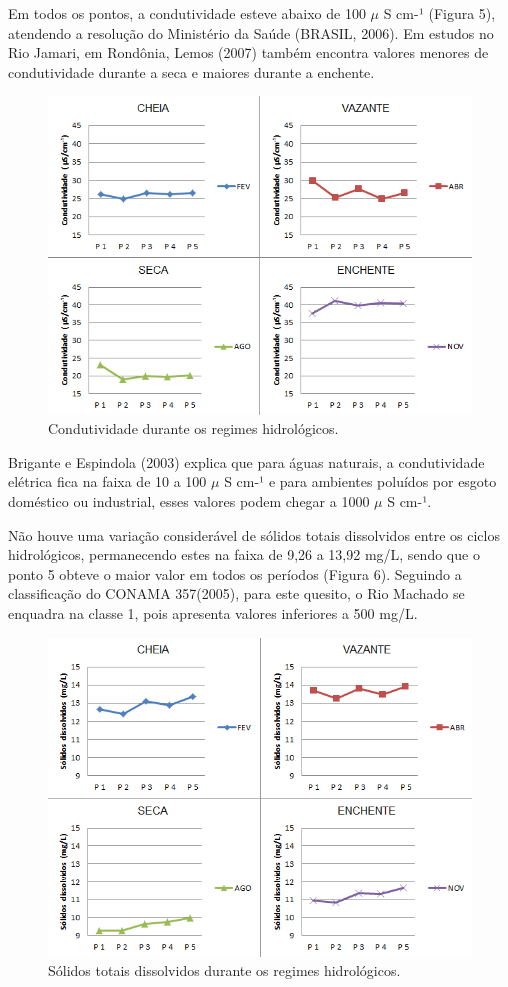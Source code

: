 \documentclass[article,12pt,onesidea,4paper,english,brazil]{abntex2}
\begin{document}
Em todos os pontos, a condutividade esteve abaixo de 100 $\mu$ S cm-¹ (Figura 5), atendendo a resolução do Ministério da Saúde (BRASIL, 2006). Em estudos no Rio Jamari, em Rondônia, Lemos (2007) também encontra valores menores de condutividade durante a seca e maiores durante a enchente.

\begin{figure}[!h]
	\centering
	\includegraphics[width=0.8\linewidth]{pip-137-05}
	\caption{Condutividade durante os regimes hidrológicos.}
\end{figure}

Brigante e Espindola (2003) explica que para águas naturais, a condutividade elétrica fica na faixa de 10 a 100 $\mu$ S cm-¹ e para ambientes poluídos por esgoto doméstico ou industrial, esses valores podem chegar a 1000 $\mu$ S cm-¹.

Não houve uma variação considerável de sólidos totais dissolvidos entre os ciclos hidrológicos, permanecendo estes na faixa de 9,26 a 13,92 mg/L, sendo que o ponto 5 obteve o maior valor em todos os períodos (Figura 6). Seguindo a classificação do CONAMA 357(2005), para este quesito, o Rio Machado se enquadra na classe 1, pois apresenta valores inferiores a 500 mg/L.

\begin{figure}[!h]
	\centering
	\includegraphics[width=0.8\linewidth]{pip-137-06}
	\caption{Sólidos totais dissolvidos durante os regimes hidrológicos.}
\end{figure}
\end{document}
